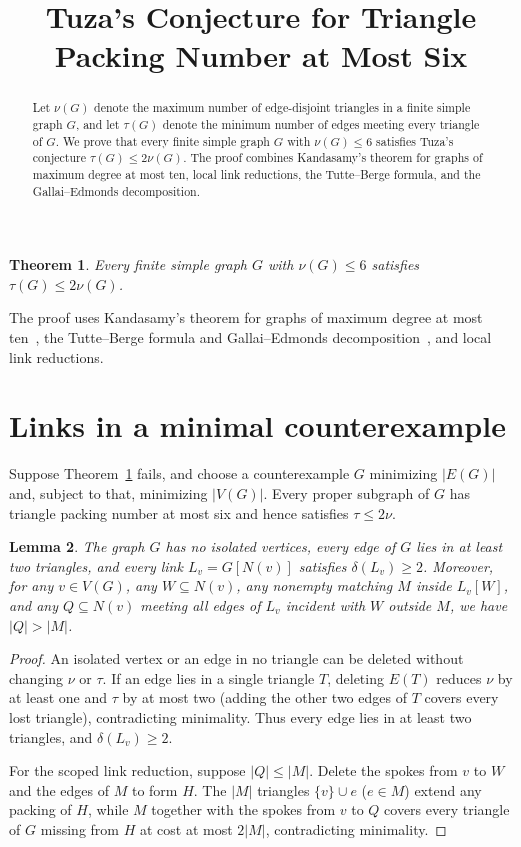 \documentclass[11pt]{article}
\title{Tuza's Conjecture for Triangle Packing Number at Most Six}
\author{}
\date{}
\newtheorem{theorem}{Theorem}
\newtheorem{lemma}[theorem]{Lemma}
\begin{document}
\maketitle

\begin{abstract}
Let $\nu(G)$ denote the maximum number of edge-disjoint triangles in a finite simple graph $G$, and let $\tau(G)$ denote the minimum number of edges meeting every triangle of $G$. We prove that every finite simple graph $G$ with $\nu(G)\leq 6$ satisfies Tuza's conjecture $\tau(G)\leq 2\nu(G)$. The proof combines Kandasamy's theorem for graphs of maximum degree at most ten, local link reductions, the Tutte--Berge formula, and the Gallai--Edmonds decomposition.
\end{abstract}

\begin{theorem}\label{thm:main}
Every finite simple graph $G$ with $\nu(G)\leq 6$ satisfies $\tau(G)\leq 2\nu(G)$.
\end{theorem}

The proof uses Kandasamy's theorem for graphs of maximum degree at most ten~\cite{Kandasamy}, the Tutte--Berge formula and Gallai--Edmonds decomposition~\cite{Schrijver}, and local link reductions.

\section{Links in a minimal counterexample}

Suppose Theorem~\ref{thm:main} fails, and choose a counterexample $G$ minimizing $|E(G)|$ and, subject to that, minimizing $|V(G)|$. Every proper subgraph of $G$ has triangle packing number at most six and hence satisfies $\tau\leq 2\nu$.

\begin{lemma}\label{lem:basic}
The graph $G$ has no isolated vertices, every edge of $G$ lies in at least two triangles, and every link $L_v=G[N(v)]$ satisfies $\delta(L_v)\geq 2$. Moreover, for any $v\in V(G)$, any $W\subseteq N(v)$, any nonempty matching $M$ inside $L_v[W]$, and any $Q\subseteq N(v)$ meeting all edges of $L_v$ incident with $W$ outside $M$, we have $|Q|>|M|$.
\end{lemma}

\begin{proof}
An isolated vertex or an edge in no triangle can be deleted without changing $\nu$ or $\tau$. If an edge lies in a single triangle $T$, deleting $E(T)$ reduces $\nu$ by at least one and $\tau$ by at most two (adding the other two edges of $T$ covers every lost triangle), contradicting minimality. Thus every edge lies in at least two triangles, and $\delta(L_v)\geq 2$.

For the scoped link reduction, suppose $|Q|\leq |M|$. Delete the spokes from $v$ to $W$ and the edges of $M$ to form $H$. The $|M|$ triangles $\{v\}\cup e$ ($e\in M$) extend any packing of $H$, while $M$ together with the spokes from $v$ to $Q$ covers every triangle of $G$ missing from $H$ at cost at most $2|M|$, contradicting minimality.
\end{proof}
\end{document}
